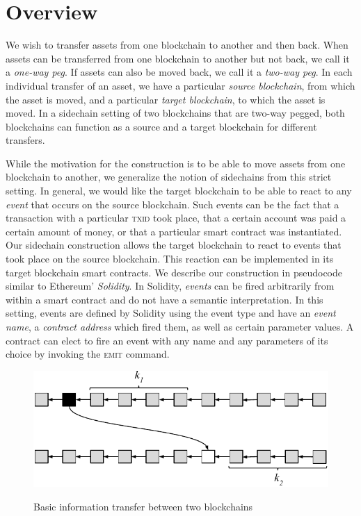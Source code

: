 \section{Overview}
We wish to transfer assets from one blockchain to another and then back. When
assets can be transferred from one blockchain to another but not back, we call
it a \emph{one-way peg}. If assets can also be moved back, we call it a
\emph{two-way peg}. In each individual transfer of an asset, we have a
particular \emph{source blockchain}, from which the asset is moved, and a
particular \emph{target blockchain}, to which the asset is moved. In a sidechain
setting of two blockchains that are two-way pegged, both blockchains can
function as a source and a target blockchain for different transfers.

While the motivation for the construction is to be able to move assets from one
blockchain to another, we generalize the notion of sidechains from this strict
setting. In general, we would like the target blockchain to be able to react to
any \emph{event} that occurs on the source blockchain. Such events can be the
fact that a transaction with a particular \textsc{txid} took place, that a
certain account was paid a certain amount of money, or that a particular smart
contract was instantiated. Our sidechain construction allows the target
blockchain to react to events that took place on the source blockchain. This
reaction can be implemented in its target blockchain smart contracts. We
describe our construction in pseudocode similar to Ethereum' \emph{Solidity}. In
Solidity, \emph{events} can be fired arbitrarily from within a smart contract
and do not have a semantic interpretation. In this setting, events are defined
by Solidity using the \textsf{event} type and have an \emph{event name}, a
\emph{contract address} which fired them, as well as certain parameter values. A
contract can elect to fire an event with any name and any parameters of its
choice by invoking the \textsc{emit} command.

\begin{figure}
    \caption{Basic information transfer between two blockchains}
    \centering
    \includegraphics[width=0.7 \columnwidth,keepaspectratio]{figures/events.pdf}
    \label{fig.events}
\end{figure}

